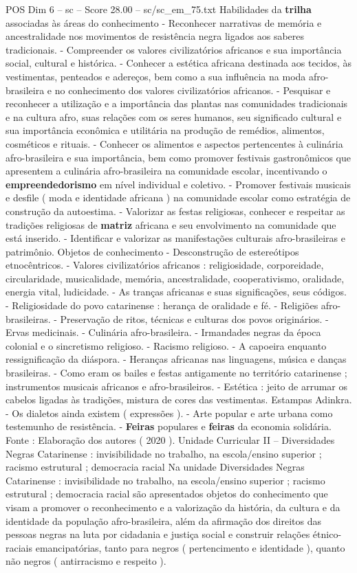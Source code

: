 \begin{textsample}{POS Dim 6 – sc – Score 28.00 – sc/sc\_em\_75.txt}
Habilidades da \textbf{trilha} associadas às áreas do conhecimento - Reconhecer narrativas de memória e ancestralidade nos movimentos de resistência negra ligados aos saberes tradicionais. - Compreender os valores civilizatórios africanos e sua importância social, cultural e histórica. - Conhecer a estética africana destinada aos tecidos, às vestimentas, penteados e adereços, bem como a sua influência na moda afro-brasileira e no conhecimento dos valores civilizatórios africanos. - Pesquisar e reconhecer a utilização e a importância das plantas nas comunidades tradicionais e na cultura afro, suas relações com os seres humanos, seu significado cultural e sua importância econômica e utilitária na produção de remédios, alimentos, cosméticos e rituais. - Conhecer os alimentos e aspectos pertencentes à culinária afro-brasileira e sua importância, bem como promover festivais gastronômicos que apresentem a culinária afro-brasileira na comunidade escolar, incentivando o \textbf{empreendedorismo} em nível individual e coletivo. - Promover festivais musicais e desfile ( moda e identidade africana ) na comunidade escolar como estratégia de construção da autoestima. - Valorizar as festas religiosas, conhecer e respeitar as tradições religiosas de \textbf{matriz} africana e seu envolvimento na comunidade que está inserido. - Identificar e valorizar as manifestações culturais afro-brasileiras e patrimônio.
Objetos de conhecimento - Desconstrução de estereótipos etnocêntricos. - Valores civilizatórios africanos : religiosidade, corporeidade, circularidade, musicalidade, memória, ancestralidade, cooperativismo, oralidade, energia vital, ludicidade. - As tranças africanas e suas significações, seus códigos. - Religiosidade do povo catarinense : herança de oralidade e fé. - Religiões afro-brasileiras. - Preservação de ritos, técnicas e culturas dos povos originários. - Ervas medicinais. - Culinária afro-brasileira. - Irmandades negras da época colonial e o sincretismo religioso. - Racismo religioso. - A capoeira enquanto ressignificação da diáspora. - Heranças africanas nas linguagens, música e danças brasileiras. - Como eram os bailes e festas antigamente no território catarinense ; instrumentos musicais africanos e afro-brasileiros. - Estética : jeito de arrumar os cabelos ligadas às tradições, mistura de cores das vestimentas.
Estampas Adinkra. - Os dialetos ainda existem ( expressões ). - Arte popular e arte urbana como testemunho de resistência. - \textbf{Feiras} populares e \textbf{feiras} da economia solidária.
Fonte : Elaboração dos autores ( 2020 ).
Unidade Curricular II – Diversidades Negras Catarinense : invisibilidade no trabalho, na escola/ensino superior ; racismo estrutural ; democracia racial Na unidade Diversidades Negras Catarinense : invisibilidade no trabalho, na escola/ensino superior ; racismo estrutural ; democracia racial são apresentados objetos do conhecimento que visam a promover o reconhecimento e a valorização da história, da cultura e da identidade da população afro-brasileira, além da afirmação dos direitos das pessoas negras na luta por cidadania e justiça social e construir relações étnico-raciais emancipatórias, tanto para negros ( pertencimento e identidade ), quanto não negros ( antirracismo e respeito ).

\end{textsample}
